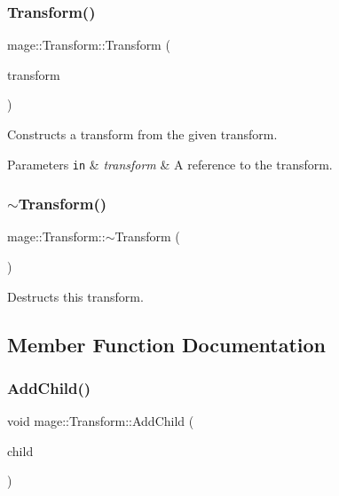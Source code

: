\subsubsection{\texorpdfstring{Transform()}{Transform()}\hspace{0.1cm}{\footnotesize\ttfamily [3/3]}}
{\footnotesize\ttfamily mage\+::\+Transform\+::\+Transform (\begin{DoxyParamCaption}\item[{\hyperlink{structmage_1_1_transform}{Transform} \&\&}]{transform }\end{DoxyParamCaption})\hspace{0.3cm}{\ttfamily [default]}}

Constructs a transform from the given transform.


\begin{DoxyParams}[1]{Parameters}
\mbox{\tt in}  & {\em transform} & A reference to the transform. \\
\hline
\end{DoxyParams}
\hypertarget{structmage_1_1_transform_a3380713ee853d112c140e8688c0f73b5}{}\label{structmage_1_1_transform_a3380713ee853d112c140e8688c0f73b5} 
\subsubsection{\texorpdfstring{$\sim$\+Transform()}{~Transform()}}
{\footnotesize\ttfamily mage\+::\+Transform\+::$\sim$\+Transform (\begin{DoxyParamCaption}{ }\end{DoxyParamCaption})}

Destructs this transform. 

\subsection{Member Function Documentation}
\hypertarget{structmage_1_1_transform_ac9fb285f730207740114b61bdb010bf9}{}\label{structmage_1_1_transform_ac9fb285f730207740114b61bdb010bf9} 
\subsubsection{\texorpdfstring{Add\+Child()}{AddChild()}}
{\footnotesize\ttfamily void mage\+::\+Transform\+::\+Add\+Child (\begin{DoxyParamCaption}\item[{\hyperlink{namespacemage_a1e01ae66713838a7a67d30e44c67703e}{Shared\+Ptr}$<$ \hyperlink{structmage_1_1_transform}{Transform} $>$}]{child }\end{DoxyParamCaption})}

